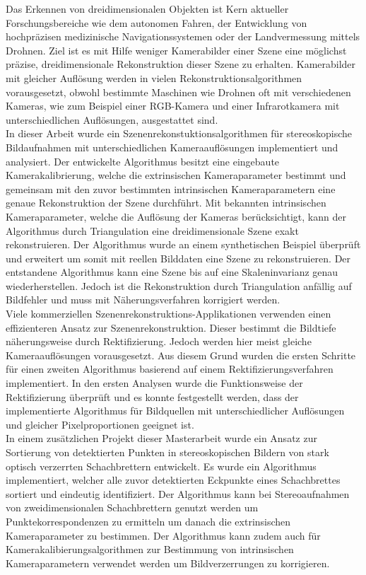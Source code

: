 
Das Erkennen von dreidimensionalen Objekten ist Kern aktueller Forschungsbereiche wie dem autonomen Fahren, der Entwicklung von hochpräzisen medizinische Navigationssystemen oder der Landvermessung mittels Drohnen. Ziel ist es mit Hilfe weniger Kamerabilder einer Szene eine möglichst präzise, dreidimensionale Rekonstruktion dieser Szene zu erhalten. Kamerabilder mit gleicher Auflösung werden in vielen Rekonstruktionsalgorithmen vorausgesetzt, obwohl bestimmte Maschinen wie Drohnen oft mit verschiedenen Kameras, wie zum Beispiel einer RGB-Kamera und einer Infrarotkamera mit unterschiedlichen Auflösungen, ausgestattet sind.   \\

In dieser Arbeit wurde ein Szenenrekonstuktionsalgorithmen für stereoskopische Bildaufnahmen mit unterschiedlichen Kameraauflösungen implementiert und analysiert. Der entwickelte Algorithmus besitzt eine eingebaute Kamerakalibrierung, welche die extrinsischen Kameraparameter bestimmt und gemeinsam mit den zuvor bestimmten intrinsischen Kameraparametern eine genaue Rekonstruktion der Szene durchführt. Mit bekannten intrinsischen Kameraparameter, welche die Auflösung der Kameras berücksichtigt, kann der Algorithmus durch Triangulation eine dreidimensionale Szene exakt rekonstruieren. Der Algorithmus wurde an einem synthetischen Beispiel überprüft und erweitert um somit mit reellen Bilddaten eine Szene zu rekonstruieren. Der entstandene Algorithmus kann eine Szene bis auf eine Skaleninvarianz genau wiederherstellen. Jedoch ist die Rekonstruktion durch Triangulation anfällig auf Bildfehler und muss mit Näherungsverfahren korrigiert werden.\\

Viele kommerziellen Szenenrekonstruktions-Applikationen verwenden einen effizienteren Ansatz zur Szenenrekonstruktion. Dieser bestimmt die Bildtiefe näherungsweise durch Rektifizierung. Jedoch werden hier meist gleiche Kameraauflösungen vorausgesetzt. Aus diesem Grund wurden die ersten Schritte für einen zweiten Algorithmus basierend auf einem Rektifizierungsverfahren implementiert. In den ersten Analysen wurde die Funktionsweise der Rektifizierung überprüft und es konnte festgestellt werden, dass der implementierte Algorithmus für Bildquellen mit unterschiedlicher Auflösungen und gleicher Pixelproportionen geeignet ist.\\

In einem zusätzlichen Projekt dieser Masterarbeit wurde ein Ansatz zur Sortierung von detektierten Punkten in stereoskopischen Bildern von stark optisch verzerrten Schachbrettern entwickelt. Es wurde ein Algorithmus implementiert, welcher alle zuvor detektierten Eckpunkte eines Schachbrettes sortiert und eindeutig identifiziert. Der Algorithmus kann bei Stereoaufnahmen von zweidimensionalen Schachbrettern genutzt werden um Punktekorrespondenzen zu ermitteln um danach die extrinsischen Kameraparameter zu bestimmen. Der Algorithmus kann zudem auch für  Kamerakalibierungsalgorithmen zur Bestimmung von intrinsischen Kameraparametern verwendet werden um Bildverzerrungen zu korrigieren.  

